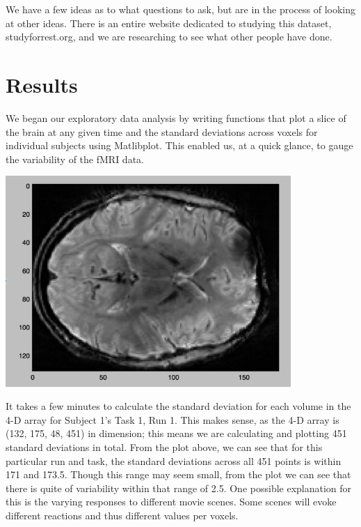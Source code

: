 \documentclass[11pt]{article}
\begin{document}
We have a few ideas as to what questions to ask, but are in the process of
looking at other ideas.  There is an entire website dedicated to studying this
dataset, studyforrest.org, and we are researching to see what other people
have done.


\section{Results}

We began our exploratory data analysis by writing functions
that plot a slice of the brain at any given time and the standard deviations
across voxels for individual subjects using Matlibplot. This enabled us, at a
quick glance, to gauge the variability of the fMRI data.

\begin{center}
\includegraphics[height=8cm]{7}
\end{center}

It takes a few minutes to calculate the standard deviation for each volume in
the 4-D array for Subject 1’s Task 1, Run 1. This makes sense, as the 4-D
array is (132, 175, 48, 451) in dimension; this means we are calculating and
plotting 451 standard deviations in total. From the plot above, we can see
that for this particular run and task, the standard deviations across all 451
points is within 171 and 173.5. Though this range may seem small, from the
plot we can see that there is quite of variability within that range of 2.5.
One possible explanation for this is the varying responses to different movie
scenes. Some scenes will evoke different reactions and thus different values
per voxels.
\end{document}
